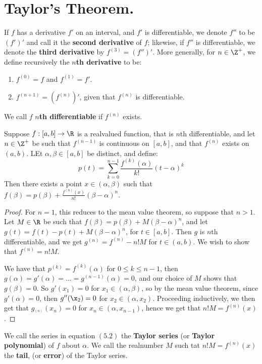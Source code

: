 
\section{Taylor's Theorem.}

\begin{definition}
    If $f$ has a derivative  $f'$ on an interval, and  $f'$ is differentiable, we 
    denote $f''$ to be  $(f')'$ and call it the \textbf{second derivative} of $f$; likewise, 
    if $f''$ is differentiable, we denote the \textbf{third derivative} by  $f^{(3)}=(f'')'$. More 
    generally, for  $n \in \Z^+$, we define recursively the  \textbf{$n$th derivative} to be:
        \begin{enumerate}[label=(\arabic*)]
            \item $f^{(0)}=f$ and $f^{(1)}=f'$.

            \item $f^{(n+1)}=(f^{(n)})'$, given that $f^{(n)}$ is differentiable.
        \end{enumerate}
        We call $f$ \textbf{$n$th differentiable} if  $f^{(n)}$ exists.
\end{definition}

\begin{theorem}\label{6.5.1}
    Suppose $f:[a,b] \rightarrow \R$ is a realvalued function, that is  $n$th differentiable, and let 
    $n \in \Z^+$ be such that $f^{(n-1)}$ is continuous on  $[a,b]$, and that  $f^{(n)}$ exists on 
    $(a,b)$. LEt  $\alpha, \beta \in [a,b]$ be distinct, and define:
        \begin{equation}
            p(t)=\sum_{k=0}^{n-1}{\frac{f^{(k)}(\alpha)}{k!}(t-\alpha)^k}		
        \end{equation}
        Then there exists a point $x \in (\alpha, \beta)$ such that $f(\beta)=p(\beta)+\frac{f^{(n)}(x)}{n!}(\beta-\alpha)^n$.
\end{theorem}
\begin{proof}
    For $n=1$, this reduces to the mean value theorem, so suppose that  $n>1$. Let $M \in \R$ be 
    such that $f(\beta)=p(\beta)+M(\beta-\alpha)^n$, and let  $g(t)=f(t)-p(t)+M(\beta-\alpha)^n$, for $t \in [a,b]$. 
    Then  $g$ is  $n$th differentiable, and  we get  $g^{(n)}=f^{(n)}-n!M$ for  $t \in (a,b)$. We 
    wish to show that $f^{(n)}=n!M$.

    We have that  $p^{(k)}=f^{(k)}(\alpha)$ for  $0 \leq k \leq n-1$, then  $g(\alpha)=g'(\alpha)= \dots = g^{(n-1)}(\alpha)=0$, 
    and our choice of  $M$ shows that  $g(\beta)=0$. So  $g'(x_1)=0$ for $x_1 \in (\alpha,\beta)$, so by 
    the mean value theorem, since $g'(\alpha)=0$, then  $g''(\x_2)=0$ for $x_2 \in (\alpha,x_2)$. Proceeding 
    inductively, we then get that $g_^{(n)}(x_n)=0$ for $x_n \in (\alpha,x_{n-1})$, hence we 
    get that $n!M=f^{(n)}(x)$.
\end{proof}

\begin{definition}		
    We call the series in equation $(5.2)$ the \textbf{Taylor series} (or \textbf{Taylor polynomial}) 
    of $f$ about  $\alpha$. We call the realnumber  $M$ such tat  $n!M=f^{(n)}(x)$ the 
    \textbf{tail},  (or \textbf{error}) of the Taylor series.
\end{definition}
